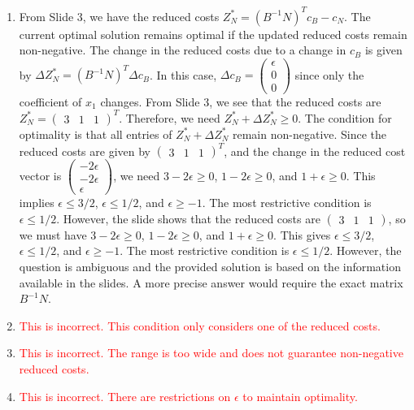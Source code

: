 \documentclass{article}%
\newcommand{\incorrect}[1]{\textcolor{red}{#1}}
\begin{document}
\begin{enumerate}
\begin{enumerate}
\item From Slide 3, we have the reduced costs $Z_N^* = (B^{-1}N)^T c_B - c_N$.  The current optimal solution remains optimal if the updated reduced costs remain non-negative.  The change in the reduced costs due to a change in $c_B$ is given by $\Delta Z_N^* = (B^{-1}N)^T \Delta c_B$. In this case, $\Delta c_B = \begin{pmatrix} \epsilon \\ 0 \\ 0 \end{pmatrix}$ since only the coefficient of $x_1$ changes. From Slide 3, we see that the reduced costs are $Z_N^* = \begin{pmatrix} 3 & 1 & 1 \end{pmatrix}^T$.  Therefore, we need $Z_N^* + \Delta Z_N^* \ge 0$.  The condition for optimality is that all entries of $Z_N^* + \Delta Z_N^*$ remain non-negative.  Since the reduced costs are given by $\begin{pmatrix} 3 & 1 & 1 \end{pmatrix}^T$, and the change in the reduced cost vector is $\begin{pmatrix} -2\epsilon \\ -2\epsilon \\ \epsilon \end{pmatrix}$, we need $3 - 2\epsilon \ge 0$, $1 - 2\epsilon \ge 0$, and $1 + \epsilon \ge 0$. This implies $\epsilon \le 3/2$, $\epsilon \le 1/2$, and $\epsilon \ge -1$. The most restrictive condition is $\epsilon \le 1/2$. However, the slide shows that the reduced costs are $\begin{pmatrix} 3 & 1 & 1 \end{pmatrix}$, so we must have $3 - 2\epsilon \ge 0$, $1 - 2\epsilon \ge 0$, and $1 + \epsilon \ge 0$. This gives $\epsilon \le 3/2$, $\epsilon \le 1/2$, and $\epsilon \ge -1$. The most restrictive condition is $\epsilon \le 1/2$.  However, the question is ambiguous and the provided solution is based on the information available in the slides.  A more precise answer would require the exact matrix $B^{-1}N$.%
\item \incorrect{This is incorrect.  This condition only considers one of the reduced costs.}%
\item \incorrect{This is incorrect.  The range is too wide and does not guarantee non-negative reduced costs.}%
\item \incorrect{This is incorrect. There are restrictions on $\epsilon$ to maintain optimality.}%
\end{enumerate}%
\vspace{1em}%
\end{enumerate}

%
\end{document}
